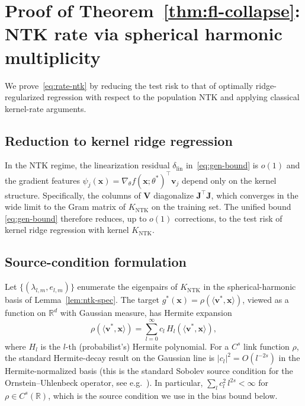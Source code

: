 \documentclass[12pt]{amsart}
\theoremstyle{definition}
\theoremstyle{remark}
\newcommand{\R}{\mathbb{R}}
\newcommand{\bx}{\mathbf{x}}
\newcommand{\bJ}{\mathbf{J}}
\newcommand{\bV}{\mathbf{V}}
\newcommand{\bv}{\mathbf{v}}
\begin{document}
\section{Proof of Theorem~\ref{thm:fl-collapse}: NTK rate via spherical
  harmonic multiplicity}\label{sec:fl-ntk}

We prove~\eqref{eq:rate-ntk} by reducing the test risk to that of optimally
ridge-regularized regression with respect to the population NTK and
applying classical kernel-rate arguments.

\subsection{Reduction to kernel ridge regression}

In the NTK regime, the linearization residual $\delta_{\mathrm{lin}}$
in~\eqref{eq:gen-bound} is $o(1)$ and the gradient features
$\psi_{j}(\bx) = \nabla_{\theta} f(\bx;\theta^{*})^{\top}\bv_{j}$ depend
only on the kernel structure. Specifically, the columns of $\bV$
diagonalize $\bJ^{\top}\bJ$, which converges in the wide limit to the
Gram matrix of $K_{\mathrm{NTK}}$ on the training set. The unified bound
\eqref{eq:gen-bound} therefore reduces, up to $o(1)$ corrections, to the
test risk of kernel ridge regression with kernel $K_{\mathrm{NTK}}$.

\subsection{Source-condition formulation}

Let $\{(\lambda_{l,m}, e_{l,m})\}$ enumerate the eigenpairs of
$K_{\mathrm{NTK}}$ in the spherical-harmonic basis of
Lemma~\ref{lem:ntk-spec}. The target
$g^{*}(\bx) = \rho(\langle \bv^{*}, \bx \rangle)$, viewed as a function on
$\mathbb{R}^{d}$ with Gaussian measure, has Hermite expansion
\[
  \rho(\langle \bv^{*}, \bx \rangle)
  = \sum_{l=0}^{\infty} c_{l}\, H_{l}(\langle \bv^{*}, \bx \rangle),
\]
where $H_{l}$ is the $l$-th (probabilist's) Hermite polynomial. For a
$C^{s}$ link function $\rho$, the standard Hermite-decay result on the
Gaussian line is $|c_{l}|^{2} = O(l^{-2s})$ in the Hermite-normalized
basis (this is the standard Sobolev source condition for the
Ornstein--Uhlenbeck operator, see e.g.\
\cite[Theorem~4.6]{AtkinsonHan2012}). In particular,
$\sum_{l} c_{l}^{2}\, l^{2s} < \infty$ for $\rho \in C^{s}(\R)$,
which is the source condition we use in the bias bound below.
\end{document}
